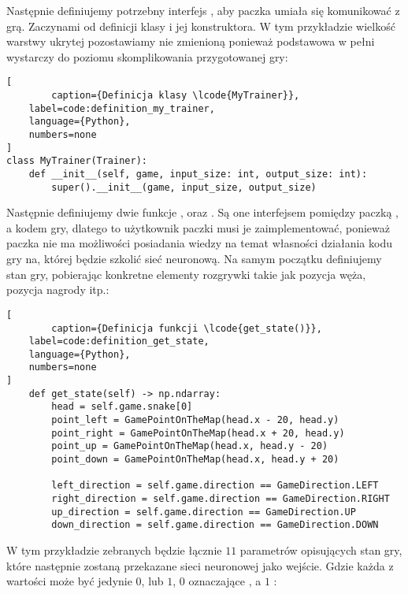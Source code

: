 Następnie definiujemy potrzebny interfejs , aby paczka  umiała się komunikować z grą. Zaczynami od definicji klasy i jej konstruktora. W tym przykładzie wielkość warstwy ukrytej pozostawiamy nie zmienioną ponieważ podstawowa w pełni wystarczy do poziomu skomplikowania przygotowanej gry:

\begin{onepage}
    \begin{lstlisting}[
        caption={Definicja klasy \lcode{MyTrainer}},
    label=code:definition_my_trainer,
    language={Python},
    numbers=none
]
class MyTrainer(Trainer):
    def __init__(self, game, input_size: int, output_size: int):
        super().__init__(game, input_size, output_size)
    \end{lstlisting}
\end{onepage}

Następnie definiujemy dwie funkcje , oraz . Są one interfejsem pomiędzy paczką , a kodem gry, dlatego to użytkownik paczki musi je zaimplementować, ponieważ paczka nie ma możliwości posiadania wiedzy na temat własności działania kodu gry na, której będzie szkolić sieć neuronową. Na samym początku definiujemy stan gry, pobierając konkretne elementy rozgrywki takie jak pozycja węża, pozycja nagrody itp.:

\begin{onepage}
    \begin{lstlisting}[
        caption={Definicja funkcji \lcode{get_state()}},
    label=code:definition_get_state,
    language={Python},
    numbers=none
]
    def get_state(self) -> np.ndarray:
        head = self.game.snake[0]
        point_left = GamePointOnTheMap(head.x - 20, head.y)
        point_right = GamePointOnTheMap(head.x + 20, head.y)
        point_up = GamePointOnTheMap(head.x, head.y - 20)
        point_down = GamePointOnTheMap(head.x, head.y + 20)

        left_direction = self.game.direction == GameDirection.LEFT
        right_direction = self.game.direction == GameDirection.RIGHT
        up_direction = self.game.direction == GameDirection.UP
        down_direction = self.game.direction == GameDirection.DOWN
    \end{lstlisting}
\end{onepage}

W tym przykładzie zebranych będzie łącznie $11$ parametrów opisujących stan gry, które następnie zostaną przekazane sieci neuronowej jako wejście. Gdzie każda z wartości może być jedynie $0$, lub $1$, $0$ oznaczające , a $1$ :

